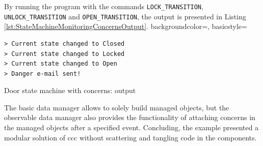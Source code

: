 By running the program with the commands \texttt{LOCK\_TRANSITION}, \texttt{UNLOCK\_TRANSITION} and \texttt{OPEN\_TRANSITION}, the output is presented in Listing \ref{lst:StateMachineMonitoringConcernsOutput}.
 {
    backgroundcolor=\color{white},
    basicstyle=\scriptsize\color{black}\ttfamily
}

\begin{sourcecode} [H]
	\lstset{numbers=none}
	\begin{lstlisting}[style=Bash]
> Current state changed to Closed
> Current state changed to Locked
> Current state changed to Open
> Danger e-mail sent!
	\end{lstlisting}
	\caption{Door state machine with concerns: output}
	\label{lst:StateMachineMonitoringConcernsOutput}
\end{sourcecode}

The basic data manager allows to solely build managed objects, but the observable data manager also provides the functionality of attaching concerns in the managed objects after a specified event.
Concluding, the example presented a modular solution of \ac{ccc} without scattering and tangling code in the components.
